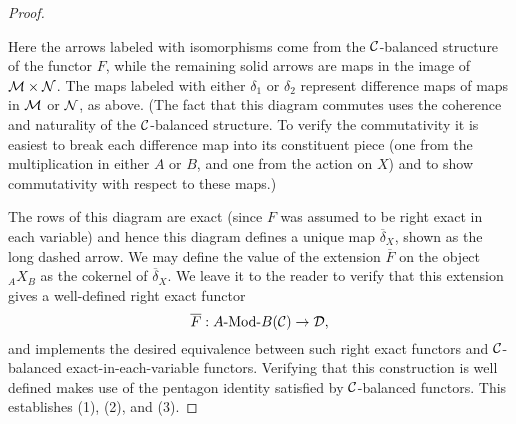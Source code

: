 \documentclass{amsart}
\begin{document}
\begin{proof}
\begin{center}
	\end{center}
  
Here the arrows labeled with isomorphisms come from the $\mathcal C$-balanced structure of the functor $F$, while the remaining solid arrows are maps in the image of $\mathcal M \times \mathcal N$. The maps labeled with either $\delta_1$ or $\delta_2$ represent difference maps of maps in $\mathcal M$ or $\mathcal N$, as above.  (The fact that this diagram commutes uses the coherence and naturality of the $\mathcal C$-balanced structure. To verify the commutativity it is easiest to break each difference map into its constituent piece (one from the multiplication in either $A$ or $B$, and one from the action on $X$) and to show commutativity with respect to these maps.)

The rows of this diagram are exact (since $F$ was assumed to be right exact in each variable) and hence this diagram defines a unique map $\overline{\delta}_X$, shown as the long dashed arrow. We may define the value of the extension $\overline{F}$ on the object ${}_AX_B$ as the cokernel of $\overline{\delta}_X$. We leave it to the reader to verify that this extension gives a well-defined right exact functor 
\begin{equation*}
	\overline{F}: \Mod{A}{B}(\cC) \to \cD,
\end{equation*} 
and implements the desired equivalence between such right exact functors and $\mathcal C$-balanced exact-in-each-variable functors. Verifying that this construction is well defined makes use of the pentagon identity satisfied by $\mathcal C$-balanced functors. This establishes (1), (2), and (3). 


\end{proof}
\end{document}
